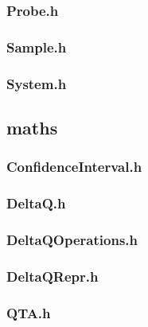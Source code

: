 \subsubsection*{Probe.h}


\subsubsection*{Sample.h}


\subsubsection*{System.h}


\subsection*{maths}

\subsubsection*{ConfidenceInterval.h}


\subsubsection*{DeltaQ.h}


\subsubsection*{DeltaQOperations.h}


\subsubsection*{DeltaQRepr.h}


\subsubsection*{QTA.h}


